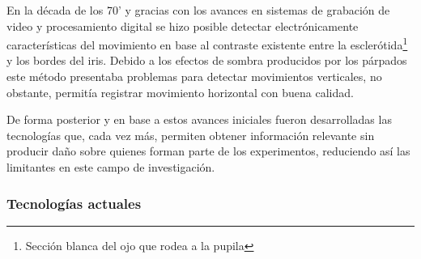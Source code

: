 \documentclass[../main.tex]{subfiles}
\begin{document}
			En la década de los 70' y gracias con los avances en sistemas de grabación de video y procesamiento digital se hizo posible detectar electrónicamente características del movimiento en base al contraste existente entre la esclerótida\footnote{Sección blanca del ojo que rodea a la pupila} y los bordes del iris. Debido a los efectos de sombra producidos por los párpados este método presentaba problemas para detectar movimientos verticales, no obstante, permitía registrar movimiento horizontal con buena calidad. 

			De forma posterior y en base a estos avances iniciales fueron desarrolladas las tecnologías que, cada vez más, permiten obtener información relevante sin producir daño sobre quienes forman parte de los experimentos, reduciendo así las limitantes en este campo de investigación.    

			\subsubsection{Tecnologías actuales}
			\label{ssub:02_tecnologias_actuales}
\end{document}
